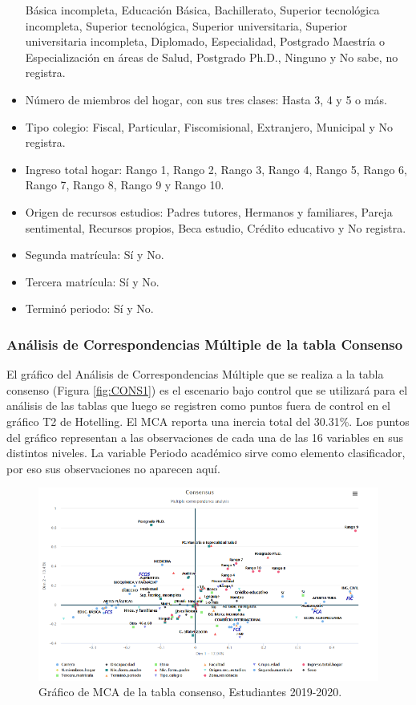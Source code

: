 \documentclass[water,article,submit,moreauthors,pdftex]{mdpi}
\begin{document}
\begin{itemize}
  Básica incompleta, Educación Básica, Bachillerato, Superior
  tecnológica incompleta, Superior tecnológica, Superior universitaria,
  Superior universitaria incompleta, Diplomado, Especialidad, Postgrado
  Maestría o Especialización en áreas de Salud, Postgrado Ph.D., Ninguno
  y No sabe, no registra.
\item
  Número de miembros del hogar, con sus tres clases: Hasta 3, 4 y 5 o
  más.
\item
  Tipo colegio: Fiscal, Particular, Fiscomisional, Extranjero, Municipal
  y No registra.
\item
  Ingreso total hogar: Rango 1, Rango 2, Rango 3, Rango 4, Rango 5,
  Rango 6, Rango 7, Rango 8, Rango 9 y Rango 10.
\item
  Origen de recursos estudios: Padres tutores, Hermanos y familiares,
  Pareja sentimental, Recursos propios, Beca estudio, Crédito educativo
  y No registra.
\item
  Segunda matrícula: Sí y No.
\item
  Tercera matrícula: Sí y No.
\item
  Terminó periodo: Sí y No.
\end{itemize}

\hypertarget{anuxe1lisis-de-correspondencias-muxfaltiple-de-la-tabla-consenso}{%
\subsubsection{Análisis de Correspondencias Múltiple de la tabla
Consenso}\label{anuxe1lisis-de-correspondencias-muxfaltiple-de-la-tabla-consenso}}

El gráfico del Análisis de Correspondencias Múltiple que se realiza a la
tabla consenso (Figura \ref{fig:CONS1}) es el escenario bajo control que
se utilizará para el análisis de las tablas que luego se registren como
puntos fuera de control en el gráfico T2 de Hotelling. El MCA reporta
una inercia total del 30.31\%. Los puntos del gráfico representan a las
observaciones de cada una de las 16 variables en sus distintos niveles.
La variable Periodo académico sirve como elemento clasificador, por eso
sus observaciones no aparecen aquí.

\begin{figure}[!ht]



\begin{center}\includegraphics[width=0.6\linewidth,]{consedu} \end{center}

\caption{Gráfico de MCA de la tabla consenso, Estudiantes 2019-2020.}

\label{fig:CONSedu}
\end{figure}
\end{document}
